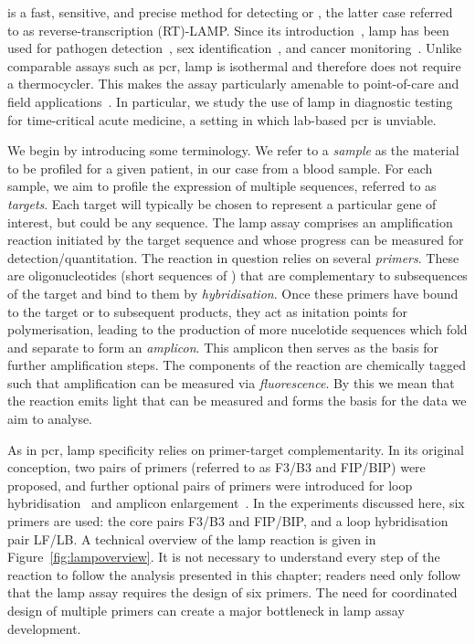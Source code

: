 \documentclass[../thesis.tex]{subfiles}
\begin{document}
 is a fast, sensitive, and precise method for detecting  or , the latter case referred to as reverse-transcription (RT)-LAMP. Since its introduction~\citep{notomi_loop-mediated_2000}, \gls{lamp} has been used for pathogen detection~\citep{mekata_real-time_2009, cao_development_2017, thiessen_development_2018}, sex identification~\citep{hirayama_embryo_2013, almasi_loop_2017, centeno-cuadros_validation_2018}, and cancer monitoring~\citep{li_loop-mediated_2016, horiuchi_novel_2020, kalofonou_novel_2020}. 
Unlike comparable assays such as \gls{pcr}, \gls{lamp} is isothermal and therefore does not require a thermocycler. This makes the assay particularly amenable to point-of-care and field applications~\citep{fu_applications_2011}. In particular, we study the use of \gls{lamp} in diagnostic testing for time-critical acute medicine, a setting in which lab-based \gls{pcr} is unviable.

We begin by introducing some terminology. We refer to a \emph{sample} as the material to be profiled for a given patient, in our case from a blood sample. For each sample, we aim to profile the expression of multiple  sequences, referred to as \emph{targets}.  Each target will typically be chosen to represent a particular gene of interest, but could be any sequence. The \gls{lamp} assay comprises an amplification reaction initiated by the target sequence and whose progress can be measured for detection/quantitation. The reaction in question relies on several \emph{primers}. These are oligonucleotides (short sequences of ) that are complementary to subsequences of the target and bind to them by \emph{hybridisation}. Once these primers have bound to the target or to subsequent products, they act as initation points for polymerisation, leading to the production of more nucelotide sequences which fold and separate to form an \emph{amplicon}. This amplicon then serves as the basis for further amplification steps. The components of the reaction are chemically tagged such that amplification can be measured via \emph{fluorescence}. By this we mean that the reaction emits light that can be measured and forms the basis for the data we aim to analyse.

As in \gls{pcr}, \gls{lamp} specificity relies on primer-target complementarity. In its original conception, two pairs of primers (referred to as F3/B3 and FIP/BIP) were proposed, and further optional pairs of primers were introduced for loop hybridisation~\citep{nagamine_accelerated_2002} and amplicon enlargement~\citep{gandelman_loop-mediated_2011}. In the experiments discussed here, six primers are used: the core pairs F3/B3 and FIP/BIP, and a loop hybridisation pair LF/LB.  A technical overview of the \gls{lamp} reaction is given in Figure~\ref{fig:lampoverview}. It is not necessary to understand every step of the reaction to follow the analysis presented in this chapter; readers need only follow that the \gls{lamp} assay requires the design of six primers. The need for coordinated design of multiple primers can create a major bottleneck in \gls{lamp} assay development.
\end{document}
